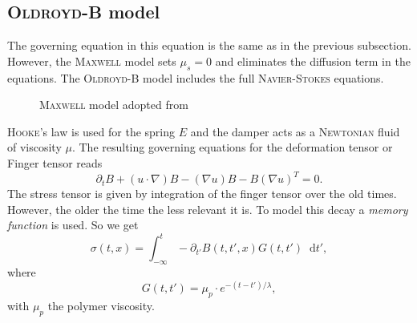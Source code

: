\documentclass[12pt,a4paper,twoside, open=right]{scrreprt}
\theoremstyle{definition}
\theoremstyle{plain}
\newcommand{\D}{\mathop{}\!\mathrm{d}}
\begin{document}
\subsection{\textsc{Oldroyd-B} model}
The governing equation in this equation is the same as in the previous subsection. However, the \textsc{Maxwell} model sets $\mu_s=0$ and eliminates the diffusion term in the equations. The \textsc{Oldroyd-B} model includes the full \textsc{Navier-Stokes} equations.
\begin{figure}
    \centering
    
    \def\svgwidth{0.5\textwidth}
    
    \caption[\textsc{Maxwell} model]{\textsc{Maxwell} model adopted from \cite{Pekaje}}
    \label{fig:maxwell}
    
\end{figure}
\textsc{Hooke}'s law is used for the spring $E$ and the damper acts as a \textsc{Newtonian} fluid of viscosity $\mu$. 
The resulting governing equations for the deformation tensor or Finger tensor reads
\begin{equation}
    \partial_t B + (u\cdot\nabla)B-(\nabla u)B-B(\nabla u)^T =0.
\end{equation}
The stress tensor is given by integration of the finger tensor over the old times. However, the older the time the less relevant it is. To model this decay a \emph{memory function} is used. So we get
\begin{equation}
     \sigma(t,x) = \int_{-\infty}^t-\partial_{t'}B(t,t',x)G(t,t')\D t',
\end{equation}
where 
\begin{equation}
    G(t,t')=\mu_p\cdot e^{-(t-t')/\lambda},
\end{equation}
with $\mu_p$ the polymer viscosity.
\end{document}
